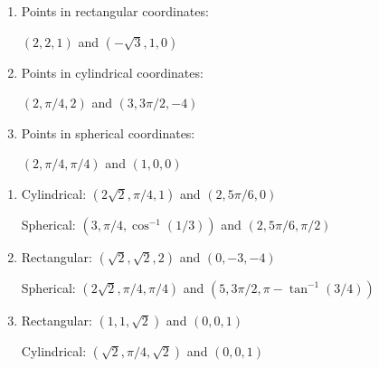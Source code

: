 {
\begin{enumerate}
	\item Points in rectangular coordinates:

$(2,2,1)$ and $(-\sqrt{3},1,0)$

	\item Points in cylindrical coordinates:
	
	$(2,\pi/4,2)$ and $(3,3\pi/2,-4)$
	
	\item Points in spherical coordinates:
	
	$(2,\pi/4,\pi/4)$ and $(1,0,0)$

\end{enumerate}
}
{\begin{enumerate}
	\item Cylindrical:	$(2\sqrt 2,\pi/4,1)$ and $(2,5\pi/6,0)$
		
		Spherical: $(3,\pi/4,\cos^{-1}(1/3))$ and $(2,5\pi/6,\pi/2)$
	\item Rectangular: 	$(\sqrt 2,\sqrt 2,2)$ and $(0,-3,-4)$
	
	Spherical: $(2\sqrt 2,\pi/4,\pi/4)$ and $(5,3\pi/2,\pi-\tan^{-1}(3/4))$
	\item Rectangular:	$(1,1,\sqrt{2})$ and $(0,0,1)$
	
	Cylindrical:	$(\sqrt{2},\pi/4,\sqrt{2})$ and $(0,0,1)$
\end{enumerate}
}
